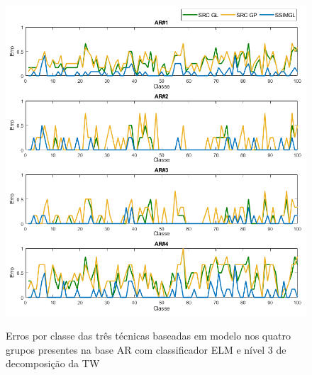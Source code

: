 \begin{figure}[H]
\centering
\caption{Erros por classe das três técnicas baseadas em modelo nos quatro grupos presentes na base AR com classificador ELM e nível 3 de decomposição da TW}
\includegraphics[scale=0.5]{imgs4/erro_todas_tecnicas_modelo.png}
\label{fig:erro_todas_tecnicas_modelo}
\end{figure}










%



